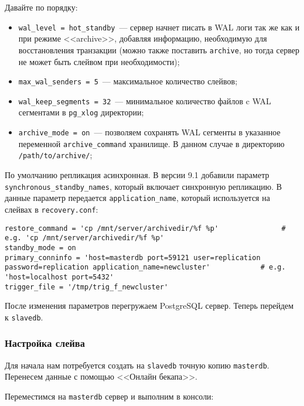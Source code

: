 Давайте по порядку:

\begin{itemize}
  \item \lstinline!wal_level = hot_standby!~--- сервер начнет писать в WAL логи так же как и при режиме <<archive>>, добавляя информацию, необходимую для восстановления транзакции (можно также поставить \lstinline!archive!, но тогда сервер не может быть слейвом при необходимости);
  \item \lstinline!max_wal_senders = 5!~--- максимальное количество слейвов;
  \item \lstinline!wal_keep_segments = 32!~--- минимальное количество файлов c WAL сегментами в \lstinline!pg_xlog! директории;
  \item \lstinline!archive_mode = on!~--- позволяем сохранять WAL сегменты в указанное переменной \lstinline!archive_command! хранилище. В данном случае в директорию \lstinline!/path/to/archive/!;
\end{itemize}

По умолчанию репликация асинхронная. В версии 9.1 добавили параметр \lstinline!synchronous_standby_names!, который включает синхронную репликацию. В данные параметр передается \lstinline!application_name!, который используется на слейвах в \lstinline!recovery.conf!:

\begin{lstlisting}[label=lst:streaming91,caption=recovery.conf для синхронной репликации на слейве]
restore_command = 'cp /mnt/server/archivedir/%f %p'               # e.g. 'cp /mnt/server/archivedir/%f %p'
standby_mode = on
primary_conninfo = 'host=masterdb port=59121 user=replication password=replication application_name=newcluster'            # e.g. 'host=localhost port=5432'
trigger_file = '/tmp/trig_f_newcluster'
\end{lstlisting}

После изменения параметров перегружаем PostgreSQL сервер. Теперь перейдем к \lstinline!slavedb!.

\subsubsection{Настройка слейва}
\label{subsec:streaming-slave-settings}

Для начала нам потребуется создать на \lstinline!slavedb! точную копию \lstinline!masterdb!. Перенесем данные с помощью <<Онлайн бекапа>>.

Переместимся на \lstinline!masterdb! сервер и выполним в консоли:

